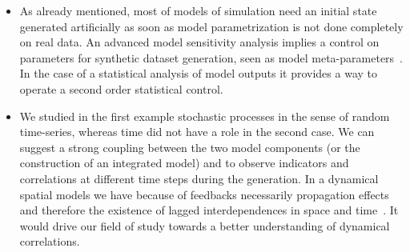 {\begin{itemize}
\item As already mentioned, most of models of simulation need an initial state generated artificially as soon as model parametrization is not done completely on real data. An advanced model sensitivity analysis implies a control on parameters for synthetic dataset generation, seen as model meta-parameters~\cite{cottineau2015revisiting}. In the case of a statistical analysis of model outputs it provides a way to operate a second order statistical control.
\item We studied in the first example stochastic processes in the sense of random time-series, whereas time did not have a role in the second case. We can suggest a strong coupling between the two model components (or the construction of an integrated model) and to observe indicators and correlations at different time steps during the generation. In a dynamical spatial models we have because of feedbacks necessarily propagation effects and therefore the existence of lagged interdependences in space and time~\cite{pigozzi1980interurban}. It would drive our field of study towards a better understanding of dynamical correlations.
\end{itemize}
}{
\begin{itemize}

\end{itemize}}
